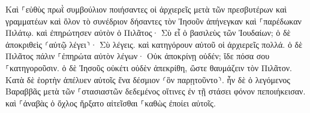 \documentclass{openreader}
\begin{document}
Καὶ ⸀εὐθὺς πρωῒ συμβούλιον ποιήσαντες οἱ ἀρχιερεῖς μετὰ τῶν πρεσβυτέρων καὶ γραμματέων καὶ ὅλον τὸ συνέδριον δήσαντες τὸν Ἰησοῦν ἀπήνεγκαν καὶ ⸀παρέδωκαν Πιλάτῳ. 
καὶ ἐπηρώτησεν αὐτὸν ὁ Πιλᾶτος· Σὺ εἶ ὁ βασιλεὺς τῶν Ἰουδαίων; ὁ δὲ ἀποκριθεὶς ⸂αὐτῷ λέγει⸃· Σὺ λέγεις. 
καὶ κατηγόρουν αὐτοῦ οἱ ἀρχιερεῖς πολλά. 
ὁ δὲ Πιλᾶτος πάλιν ⸀ἐπηρώτα αὐτὸν λέγων· Οὐκ ἀποκρίνῃ οὐδέν; ἴδε πόσα σου ⸀κατηγοροῦσιν. 
ὁ δὲ Ἰησοῦς οὐκέτι οὐδὲν ἀπεκρίθη, ὥστε θαυμάζειν τὸν Πιλᾶτον. 
Κατὰ δὲ ἑορτὴν ἀπέλυεν αὐτοῖς ἕνα δέσμιον ⸂ὃν παρῃτοῦντο⸃. 
ἦν δὲ ὁ λεγόμενος Βαραββᾶς μετὰ τῶν ⸀στασιαστῶν δεδεμένος οἵτινες ἐν τῇ στάσει φόνον πεποιήκεισαν. 
καὶ ⸀ἀναβὰς ὁ ὄχλος ἤρξατο αἰτεῖσθαι ⸀καθὼς ἐποίει αὐτοῖς. 
\end{document}

